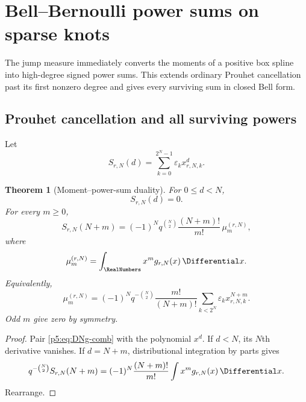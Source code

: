 \documentclass[11pt]{article}
\newtheorem{theorem}{Theorem}[section]
\theoremstyle{definition}
\theoremstyle{remark}
\newcommand{\eps}{\varepsilon}
\begin{document}
\section{Bell--Bernoulli power sums on sparse knots}
\label{p5:sec:power-sums}

The jump measure immediately converts the moments of a positive box spline
into high-degree signed power sums.  This extends ordinary Prouhet cancellation
past its first nonzero degree and gives every surviving sum in closed Bell form.

\subsection{Prouhet cancellation and all surviving powers}

Let
\begin{equation}
 S_{r,N}(d)=\sum_{k=0}^{2^N-1}\eps_k x_{r,N,k}^{d}.         \label{p5:eq:S-rNd}
\end{equation}

\begin{theorem}[Moment--power-sum duality]
\label{p5:thm:moment-power-duality}
For $0\le d<N$,
\begin{equation}
 S_{r,N}(d)=0.                                             \label{p5:eq:Prouhet-sparse}
\end{equation}
For every $m\ge0$,
\begin{equation}
 \boxed{\displaystyle
 S_{r,N}(N+m)=(-1)^Nq^{\binom N2}
   \frac{(N+m)!}{m!}\,\mu_m^{(r,N)},}                     \label{p5:eq:power-sum-moment}
\end{equation}
where
\begin{equation}
 \mu_m^{(r,N)}=\int_{\RealNumbers}x^m g_{r,N}(x)\,\Differential x.            \label{p5:eq:finite-moment}
\end{equation}
Equivalently,
\begin{equation}
 \boxed{\displaystyle
 \mu_m^{(r,N)}=(-1)^Nq^{-\binom N2}\frac{m!}{(N+m)!}
   \sum_{k<2^N}\eps_kx_{r,N,k}^{N+m}.}                   \label{p5:eq:moment-from-TM}
\end{equation}
Odd $m$ give zero by symmetry.
\end{theorem}

\begin{proof}
Pair \eqref{p5:eq:DNg-comb} with the polynomial $x^d$.  If $d<N$, its $N$th
derivative vanishes.  If $d=N+m$, distributional integration by parts gives
\[
 q^{-\binom N2}S_{r,N}(N+m)
 =(-1)^N\frac{(N+m)!}{m!}\int x^m g_{r,N}(x)\,\Differential x.
\]
Rearrange.
\end{proof}
\end{document}
